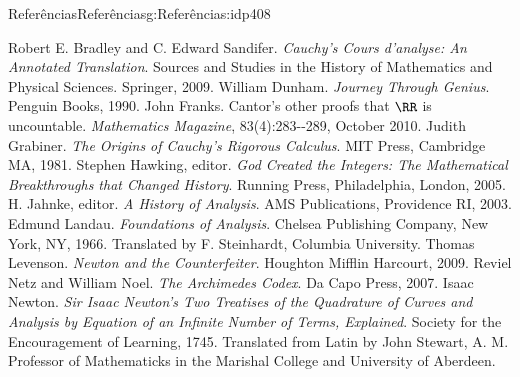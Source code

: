 \typeout{************************************************}
\typeout{************************************************}
%
\begin{references-chapter-numberless}{Referências}{}{Referências}{}{}{g:Referências:idp408}
	\begin{referencelist}
		\hypertarget{x:biblio:bradley09__cauch_cours}{}Robert E. Bradley and C. Edward Sandifer. \emph{\textit{Cauchy's Cours d'analyse}: An Annotated Translation}. Sources and Studies in the History of Mathematics and Physical Sciences. Springer, 2009.
		\hypertarget{x:biblio:dunham90__journ_throug_genius}{}William Dunham. \emph{Journey Through Genius}. Penguin Books, 1990.
		\hypertarget{x:biblio:franks10__cantor_other_proof_rr_uncoun}{}John Franks. Cantor's other proofs that \(\RR\) is uncountable. \emph{Mathematics Magazine}, 83(4):283-{}-{}289, October 2010.
		\hypertarget{x:biblio:grabiner81__origin_cauch_rigor_calculy}{}Judith Grabiner. \emph{The Origins of Cauchy's Rigorous Calculus}. MIT Press, Cambridge MA, 1981.
		\hypertarget{x:biblio:hawking05__god_creat_integ}{}Stephen Hawking, editor. \emph{God Created the Integers: The Mathematical Breakthroughs that Changed History}. Running Press, Philadelphia, London, 2005.
		\hypertarget{x:biblio:jahnke03__histor_analy}{}H. Jahnke, editor. \emph{A History of Analysis}. AMS Publications, Providence RI, 2003.
		\hypertarget{x:biblio:landau66__found_analy}{}Edmund Landau. \emph{Foundations of Analysis}. Chelsea Publishing Company, New York, NY, 1966. Translated by F. Steinhardt, Columbia University.
		\hypertarget{x:biblio:levenson09__newton_count}{}Thomas Levenson. \emph{Newton and the Counterfeiter}. Houghton Mifflin Harcourt, 2009.
		\hypertarget{x:biblio:netz07__archim_codex}{}Reviel Netz and William Noel. \emph{The Archimedes Codex}. Da Capo Press, 2007.
		\hypertarget{x:biblio:newton45__sir_isaac_two_treat_quadr}{}Isaac Newton. \emph{Sir Isaac Newton's Two Treatises of the Quadrature of Curves and Analysis by Equation of an Infinite Number of Terms, Explained}. Society for the Encouragement of Learning, 1745. Translated from Latin by John Stewart, A. M. Professor of Mathematicks in the Marishal College and University of Aberdeen.

\end{referencelist}
\end{references-chapter-numberless}
